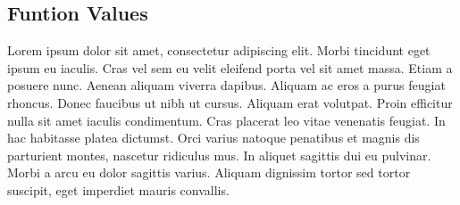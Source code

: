 \subsection{Funtion Values}
\label{chBsFV}
Lorem ipsum dolor sit amet, consectetur adipiscing elit. Morbi tincidunt eget
ipsum eu iaculis. Cras vel sem eu velit eleifend porta vel sit amet massa. Etiam
a posuere nunc. Aenean aliquam viverra dapibus. Aliquam ac eros a purus feugiat
rhoncus. Donec faucibus ut nibh ut cursus. Aliquam erat volutpat. Proin efficitur
nulla sit amet iaculis condimentum. Cras placerat leo vitae venenatis feugiat. In
hac habitasse platea dictumst. Orci varius natoque penatibus et magnis dis
parturient montes, nascetur ridiculus mus. In aliquet sagittis dui eu pulvinar.
Morbi a arcu eu dolor sagittis varius. Aliquam dignissim tortor sed tortor
suscipit, eget imperdiet mauris convallis.~\cite[p.~00]{todoCitation}\todoCitation
%
